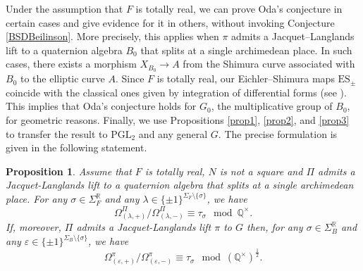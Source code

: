 \documentclass{amsart}
\newtheorem{proposition}[theorem]{Proposition}
\theoremstyle{definition}
\theoremstyle{remark}
\numberwithin{equation}{section}
\newcommand{\PGL}{{\mathrm{PGL}}}
\newcommand{\Q}{{\mathbb Q}}
\newcommand{\R}{{\mathbb R}}
\begin{document}
 
Under the assumption that $F$ is totally real, we can prove Oda's conjecture in certain cases and give evidence for it in others, without invoking Conjecture \ref{BSDBeilinson}. More precisely, this applies when $\pi$ admits a Jacquet--Langlands lift to a quaternion algebra $B_0$ that splits at a single archimedean  place. In such cases, there exists a morphism $X_{B_0}\rightarrow A$ from the Shimura curve associated with $B_0$ to the elliptic curve $A$. Since $F$ is totally real, our Eichler--Shimura maps $\mathrm{ES}_\pm$ coincide with the classical ones given by integration of differential forms (see \cite{ESsanti}). This implies that Oda's conjecture holds for $G_0$, the multiplicative group of $B_0$, for geometric reasons. Finally, we use Propositions \ref{prop1}, \ref{prop2}, and \ref{prop3} to transfer the result to $\PGL_2$ and any general $G$. The precise formulation is given in the following statement.
\begin{proposition}\label{oldOda1}
Assume that $F$ is totally real, $N$ is not a square and $\Pi$ admits a Jacquet-Langlands lift  to a quaternion algebra that splits at a single archimedean place.  For any $\sigma\in\Sigma_F^\R$ and any $\lambda\in\{\pm 1\}^{\Sigma_F\setminus\{\sigma\}}$, we have 
\begin{equation*}
 \Omega^\Pi_{(\lambda,+)}/\Omega^\Pi_{(\lambda,-)}\equiv \tau_\sigma\mod\Q^\times.
\end{equation*}
If, moreover, $\Pi$ admits a Jacquet-Langlands lift $\pi$  to $G$ then, for any $\sigma\in\Sigma_B^\R$ and any $\varepsilon\in\{\pm 1\}^{\Sigma_B\setminus\{\sigma\}}$, we have 
\begin{equation}\label{eq:oda}
 \Omega^\pi_{(\varepsilon,+)}/\Omega^\pi_{(\varepsilon,-)}\equiv \tau_\sigma\mod(\Q^\times)^{\frac{1}{2}}.
\end{equation}
\end{proposition}
\end{document}
